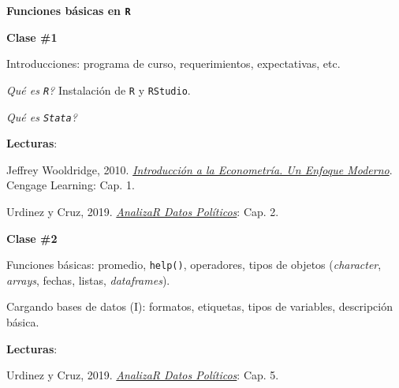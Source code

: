 \documentclass[letterpaper]{article}
\renewenvironment{itemize}{
  \begin{list}{}{
    \setlength{\leftmargin}{1.5em}
  }
}{
  \end{list}
}
\begin{document}
\begin{enumerate}
	\item {\bf Funciones b\'asicas en \texttt{R}}

			\begin{itemize} 
				\item[$\bullet$] {\bf Clase \#1}
				\begin{itemize} 
					\item[$\circ$] Introducciones: programa de curso, requerimientos, expectativas, etc.
					\item[$\circ$] \emph{Qu\'e es \texttt{R}?} Instalaci\'on de \texttt{R} y \texttt{RStudio}.
          \item[$\circ$] \emph{Qu\'e es \texttt{Stata}?}
					\item[$\circ$] {\bf Lecturas}: 
						\begin{itemize} 
							\item[$\diamond$] Jeffrey Wooldridge, 2010. \href{https://github.com/hbahamonde/Metodos_de_Investigacion/raw/master/Readings/Wooldridge.pdf}{\emph{Introducci\'on a la Econometr\'ia. Un Enfoque Moderno}}. Cengage Learning: Cap. 1.
							\item[$\diamond$] Urdinez y Cruz, 2019. \href{https://arcruz0.github.io/libroadp/index.html}{\emph{AnalizaR Datos Políticos}}: Cap. 2.
						\end{itemize}
				\end{itemize}
			\end{itemize}






			\begin{itemize} 
				\item[$\bullet$] {\bf Clase \#2}
				\begin{itemize} 
					\item[$\circ$] Funciones b\'asicas: promedio, \texttt{help()}, operadores, tipos de objetos (\emph{character}, \emph{arrays}, fechas, listas, \emph{dataframes}).
					\item[$\circ$] Cargando bases de datos (I): formatos, etiquetas, tipos de variables, descripci\'on b\'asica. %
					\item[$\circ$] {\bf Lecturas}: 
					\begin{itemize}
						\item[$\diamond$] Urdinez y Cruz, 2019. \href{https://arcruz0.github.io/libroadp/index.html}{\emph{AnalizaR Datos Políticos}}: Cap. 5.
					\end{itemize}
				\end{itemize}
			\end{itemize}



\end{enumerate}
\end{document}
